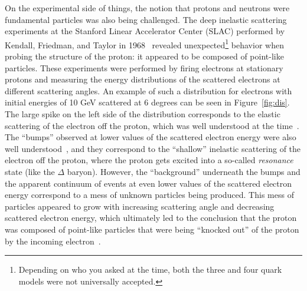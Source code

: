 On the experimental side of things, the notion that protons and neutrons were fundamental particles was also being challenged. The deep inelastic scattering experiments at the Stanford Linear Accelerator Center (SLAC) performed by Kendall, Friedman, and Taylor in 1968~\cite{Kendall, Friedman, Taylor} revealed unexpected\footnote{Depending on who you asked at the time, both the three and four quark models were not universally accepted.} behavior when probing the structure of the proton: it appeared to be composed of point-like particles. These experiments were performed by firing electrons at stationary protons and measuring the energy distributions of the scattered electrons at different scattering angles. An example of such a distribution for electrons with initial energies of 10 GeV scattered at 6 degrees can be seen in Figure~\ref{fig:dis}. The large spike on the left side of the distribution corresponds to the elastic scattering of the electron off the proton, which was well understood at the time~\cite{ElasticScattering}. The ``bumps'' observed at lower values of the scattered electron energy were also well understood~\cite{Resonances}, and they correspond to the ``shallow'' inelastic scattering of the electron off the proton, where the proton gets excited into a so-called \textit{resonance} state (like the $\Delta$ baryon). However, the ``background'' underneath the bumps and the apparent continuum of events at even lower values of the scattered electron energy correspond to a mess of unknown particles being produced. This mess of particles appeared to grow with increasing scattering angle and decreasing scattered electron energy, which ultimately led to the conclusion that the proton was composed of point-like particles that were being ``knocked out'' of the proton by the incoming electron~\cite{Kendall, BjorkenScaling}.

